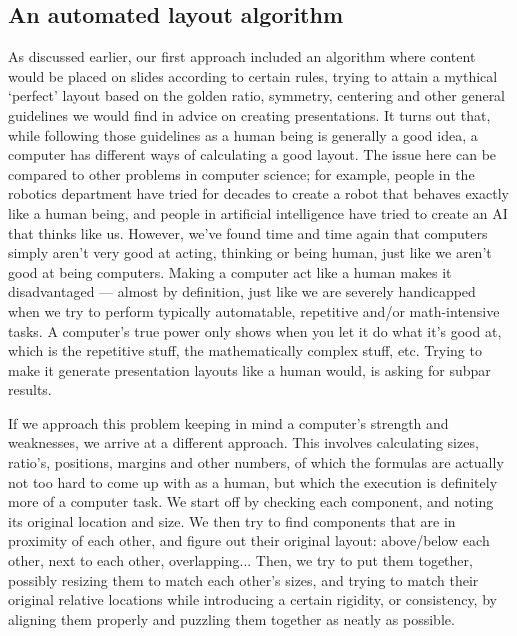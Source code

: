    \subsection{An automated layout algorithm}

    As discussed earlier, our first approach included an algorithm where
    content would be placed on slides according to certain rules, trying to
    attain a mythical `perfect' layout based on the golden ratio, symmetry,
    centering and other general guidelines we would find in advice on creating
    presentations. It turns out that, while following those guidelines as a
    human being is generally a good idea, a computer has different ways of
    calculating a good layout. The issue here can be compared to other problems
    in computer science; for example, people in the robotics department have
    tried for decades to create a robot that behaves exactly like a human
    being, and people in artificial intelligence have tried to create an AI
    that thinks like us. However, we've found time and time again that
    computers simply aren't very good at acting, thinking or being human, just
    like we aren't good at being computers. Making a computer act like a human
    makes it disadvantaged --- almost by definition, just like we are severely
    handicapped when we try to perform typically automatable, repetitive and/or
    math-intensive tasks. A computer's true power only shows when you let it do
    what it's good at, which is the repetitive stuff, the mathematically
    complex stuff, etc. Trying to make it generate presentation layouts like a
    human would, is asking for subpar results.

    If we approach this problem keeping in mind a computer's strength and
    weaknesses, we arrive at a different approach. This involves calculating
    sizes, ratio's, positions, margins and other numbers, of which the formulas
    are actually not too hard to come up with as a human, but which the
    execution is definitely more of a computer task. We start off by checking
    each component, and noting its original location and size. We then try to
    find components that are in proximity of each other, and figure out their
    original layout: above/below each other, next to each other, overlapping...
    Then, we try to put them together, possibly resizing them to match each
    other's sizes, and trying to match their original relative locations while
    introducing a certain rigidity, or consistency, by aligning them properly
    and puzzling them together as neatly as possible.
   
